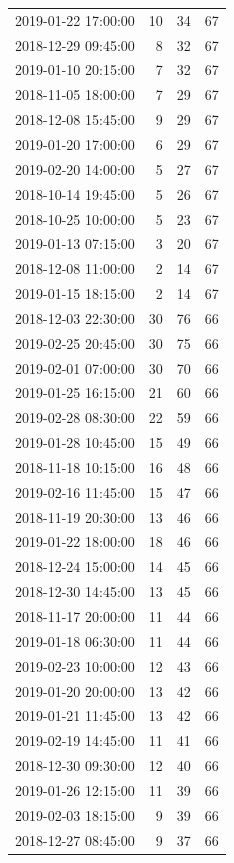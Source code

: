\begin{tabular}{lrrr}
2019-01-22 17:00:00 & 10 & 34 & 67 \\
2018-12-29 09:45:00 & 8 & 32 & 67 \\
2019-01-10 20:15:00 & 7 & 32 & 67 \\
2018-11-05 18:00:00 & 7 & 29 & 67 \\
2018-12-08 15:45:00 & 9 & 29 & 67 \\
2019-01-20 17:00:00 & 6 & 29 & 67 \\
2019-02-20 14:00:00 & 5 & 27 & 67 \\
2018-10-14 19:45:00 & 5 & 26 & 67 \\
2018-10-25 10:00:00 & 5 & 23 & 67 \\
2019-01-13 07:15:00 & 3 & 20 & 67 \\
2018-12-08 11:00:00 & 2 & 14 & 67 \\
2019-01-15 18:15:00 & 2 & 14 & 67 \\
2018-12-03 22:30:00 & 30 & 76 & 66 \\
2019-02-25 20:45:00 & 30 & 75 & 66 \\
2019-02-01 07:00:00 & 30 & 70 & 66 \\
2019-01-25 16:15:00 & 21 & 60 & 66 \\
2019-02-28 08:30:00 & 22 & 59 & 66 \\
2019-01-28 10:45:00 & 15 & 49 & 66 \\
2018-11-18 10:15:00 & 16 & 48 & 66 \\
2019-02-16 11:45:00 & 15 & 47 & 66 \\
2018-11-19 20:30:00 & 13 & 46 & 66 \\
2019-01-22 18:00:00 & 18 & 46 & 66 \\
2018-12-24 15:00:00 & 14 & 45 & 66 \\
2018-12-30 14:45:00 & 13 & 45 & 66 \\
2018-11-17 20:00:00 & 11 & 44 & 66 \\
2019-01-18 06:30:00 & 11 & 44 & 66 \\
2019-02-23 10:00:00 & 12 & 43 & 66 \\
2019-01-20 20:00:00 & 13 & 42 & 66 \\
2019-01-21 11:45:00 & 13 & 42 & 66 \\
2019-02-19 14:45:00 & 11 & 41 & 66 \\
2018-12-30 09:30:00 & 12 & 40 & 66 \\
2019-01-26 12:15:00 & 11 & 39 & 66 \\
2019-02-03 18:15:00 & 9 & 39 & 66 \\
2018-12-27 08:45:00 & 9 & 37 & 66 \\

\end{tabular}
